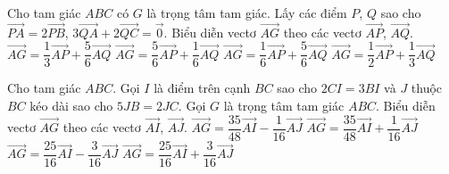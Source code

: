 \begin{ex}%
	Cho tam giác $ABC$ có $G$ là trọng tâm tam giác. Lấy các điểm $P$, $Q$ sao cho $\overrightarrow{PA}=2\overrightarrow{PB}$, $3\overrightarrow{QA}+2\overrightarrow{QC}=\overrightarrow{0}$. Biểu diễn vectơ $\overrightarrow{AG}$ theo các vectơ $\overrightarrow{AP}$, $\overrightarrow{AQ}$.
	\choice
	{$\overrightarrow{AG}=\dfrac{1}{3}\overrightarrow{AP}+\dfrac{5}{6}\overrightarrow{AQ}$}
	{$\overrightarrow{AG}=\dfrac{5}{6}\overrightarrow{AP}+\dfrac{1}{6}\overrightarrow{AQ}$}
	{\True $\overrightarrow{AG}=\dfrac{1}{6}\overrightarrow{AP}+\dfrac{5}{6}\overrightarrow{AQ}$}
	{$\overrightarrow{AG}=\dfrac{1}{2}\overrightarrow{AP}+\dfrac{1}{3}\overrightarrow{AQ}$}
\end{ex}

\begin{ex}%
	Cho tam giác $ABC$. Gọi $I$ là điểm trên cạnh $BC$ sao cho $2CI=3BI$ và $J$ thuộc $BC$ kéo dài sao cho $5JB=2JC$. Gọi $G$ là trọng tâm tam giác $ABC$. Biểu diễn vectơ $\overrightarrow{AG}$ theo các vectơ $\overrightarrow{AI}$, $\overrightarrow{AJ}$.
	\choice
	{\True $\overrightarrow{AG}=\dfrac{35}{48}\overrightarrow{AI}-\dfrac{1}{16}\overrightarrow{AJ}$}
	{$\overrightarrow{AG}=\dfrac{35}{48}\overrightarrow{AI}+\dfrac{1}{16}\overrightarrow{AJ}$}
	{$\overrightarrow{AG}=\dfrac{25}{16}\overrightarrow{AI}-\dfrac{3}{16}\overrightarrow{AJ}$}
	{$\overrightarrow{AG}=\dfrac{25}{16}\overrightarrow{AI}+\dfrac{3}{16}\overrightarrow{AJ}$}
\end{ex}

